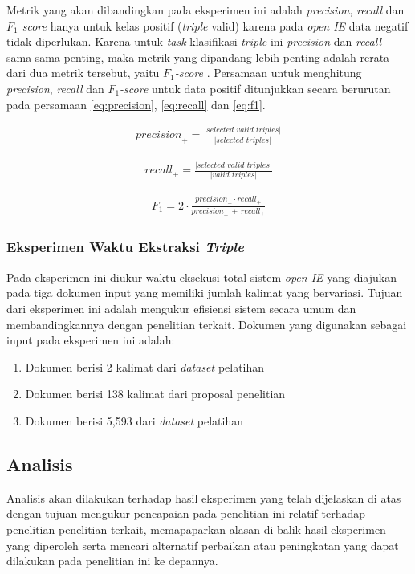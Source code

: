 Metrik yang akan dibandingkan pada eksperimen ini adalah \textit{precision}, \textit{recall} dan \textit{$F_1$ score} hanya untuk kelas positif (\textit{triple} valid) karena pada \textit{open IE} data negatif tidak diperlukan. Karena untuk \textit{task} klasifikasi \textit{triple} ini \textit{precision} dan \textit{recall} sama-sama penting, maka metrik yang dipandang lebih penting adalah rerata dari dua metrik tersebut, yaitu \textit{$F_1$-score} \citep{angeli2015leveraging}. Persamaan untuk menghitung \textit{precision}, \textit{recall} dan \textit{$F_1$-score} untuk data positif ditunjukkan secara berurutan pada persamaan \ref{eq:precision}, \ref{eq:recall} dan \ref{eq:f1}.

\noindent \begin{align}\label{eq:precision}
	\textit{precision}_+ = \frac{|\textit{selected valid triples}|}{|\textit{selected triples}|}
\end{align}

\noindent \begin{align}\label{eq:recall}
	\textit{recall}_+ = \frac{|\textit{selected valid triples}|}{|\textit{valid triples}|}
\end{align}

\noindent \begin{align}\label{eq:f1}
	F_{1} = 2 \cdot \frac{\textit{precision}_+ \cdot \textit{recall}_+ }{ \textit{precision}_+ \, + \, \textit{recall}_+}
\end{align}


\subsubsection{Eksperimen Waktu Ekstraksi \textit{Triple}}

Pada eksperimen ini diukur waktu eksekusi total sistem \textit{open IE} yang diajukan pada tiga dokumen input yang memiliki jumlah kalimat yang bervariasi. Tujuan dari eksperimen ini adalah mengukur efisiensi sistem secara umum dan membandingkannya dengan penelitian terkait. Dokumen yang digunakan sebagai input pada eksperimen ini adalah:

\begin{enumerate}
\item Dokumen berisi 2 kalimat dari \textit{dataset} pelatihan
\item Dokumen berisi 138 kalimat dari proposal penelitian
\item Dokumen berisi 5,593 dari \textit{dataset} pelatihan
\end{enumerate}

\subsection{Analisis}

Analisis akan dilakukan terhadap hasil eksperimen yang telah dijelaskan di atas dengan tujuan mengukur pencapaian pada penelitian ini relatif terhadap penelitian-penelitian terkait, memapaparkan alasan di balik hasil eksperimen yang diperoleh serta mencari alternatif perbaikan atau peningkatan yang dapat dilakukan pada penelitian ini ke depannya.
